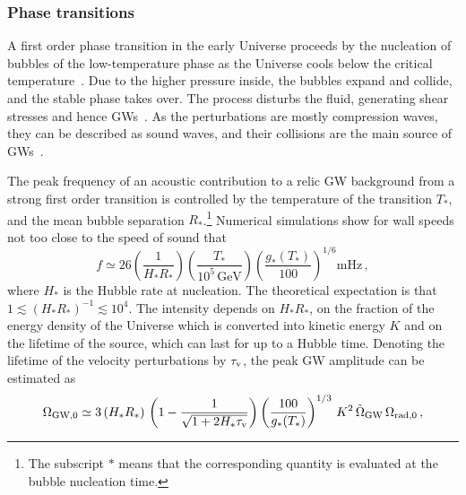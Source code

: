 \documentclass[11pt,a4paper]{article}
\begin{document}

\subsubsection{Phase transitions}
\label{sec:PhaseTransitions}

A first order phase transition in the early Universe proceeds by the nucleation of bubbles of the low-temperature phase as the Universe cools below the critical temperature~\cite{Steinhardt:1981ct,Hogan:1984hx}.  Due to the higher pressure inside, the bubbles expand and collide, and the stable phase takes over.  The process disturbs the fluid, generating shear stresses and hence GWs~\cite{Witten:1984rs,Hogan:1986qda}. As the perturbations are mostly compression waves, they can be described as sound waves, and
their collisions are the main source of GWs~\cite{Hindmarsh:2013xza,Hindmarsh:2015qta,Hindmarsh:2017gnf}. \par
The peak frequency of an acoustic contribution to a relic GW background from a strong first order transition is controlled by the temperature of the transition $T_{\ast}$, and the mean bubble separation $R_*$.\footnote{The subscript $*$ means that the corresponding quantity is evaluated at the bubble nucleation time.} Numerical simulations show for wall speeds not too close to the speed of sound that~\cite{Hindmarsh:2017gnf}
\begin{equation}
    f \simeq 26 \left( \frac{1}{H _\ast R _\ast} \right)
\left(  \frac{T_{\ast} }{10^5 \, \text{GeV}} \right) \left( \frac{g_\ast (T_\ast)}{100 } \right)^{1/6}   \text{mHz} \,,
\label{eq:PTf}
\end{equation}
where $H_\ast$ is the Hubble rate at nucleation. The theoretical expectation is that $1 \lesssim (H _\ast R _\ast )^{-1} \lesssim 10^4$.
The intensity depends on $H_\ast R_\ast$, on the fraction of the energy density of the Universe which is converted into kinetic energy $K$ and on the lifetime of the source, which can last for up to a Hubble time.
Denoting the lifetime of the velocity perturbations by $\tau _{\rm v}$, the peak GW amplitude can be estimated as \cite{Hindmarsh:2015qta,Guo:2020grp}
\begin{equation}
\Omega_{\text{GW},0} \simeq 3 \,(H _\ast  R _\ast) \, \left(1- \frac{1}{\sqrt{1+2 H_\ast \tau_{\rm v}}}\right) \left( \frac{100}{g_\ast (T_\ast)} \right)^{1/3} \, K^2 \, \tilde\Omega_\text{GW} \, \Omega_{\text{rad},0} \,,
\label{eq:PTOmega}
\end{equation}
\end{document}
